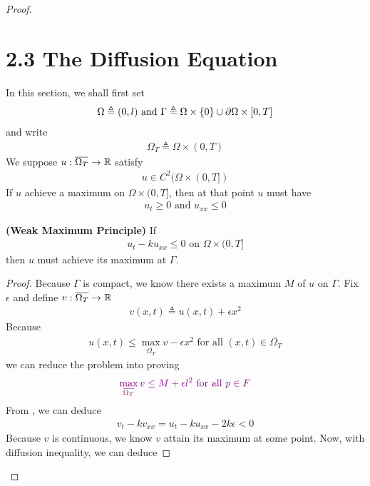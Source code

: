 \documentclass{report}
\begin{document}
\begin{proof}
\section{2.3 The Diffusion Equation}
\begin{mdframed}
In this section, we shall first set 
\begin{align*}
\Omega \triangleq (0,l)\text{ and }\Gamma \triangleq \Omega \times \{ 0 \}\cup  \partial \Omega \times [0,T]
\end{align*}
and write  
\begin{align*}
\Omega_T\triangleq \Omega \times (0,T)
\end{align*}
We suppose $u:\overline{\Omega_T}\rightarrow \mathbb{R}$ satisfy 
\begin{align*}
  u \in C^2(\Omega \times (0,T])
\end{align*}
If $u$ achieve a maximum on $\Omega \times (0,T]$, then at that point $u$ must have 
\begin{align*}
u_t\geq 0\text{ and }u_{xx}\leq 0
\end{align*}
\end{mdframed}
\begin{theorem}
\textbf{(Weak Maximum Principle)} If 
\begin{align}
\label{utk}
  u_t-ku_{xx}\leq  0\text{ on }\Omega \times (0,T]
\end{align}
then $u$ must achieve its maximum at  $\Gamma $.  
\end{theorem}
\begin{proof}
Because $\Gamma $ is compact, we know there exists a maximum $M$ of $u$ on $\Gamma $. Fix $\epsilon $ and define $v:\overline{\Omega_T}\rightarrow \mathbb{R}$
\begin{align*}
v(x,t)\triangleq u(x,t)+ \epsilon x^2
\end{align*}
Because 
\begin{align*}
u(x,t) \leq \max_{\overline{\Omega_T}}v - \epsilon x^2\text{ for all }(x,t)\in \overline{\Omega_T}
\end{align*}
we can reduce the problem into proving 
\begin{align*}
\textcolor{violet}{\max_{\overline{\Omega_T}}v\leq M+\epsilon l^2\text{ for all }p \in F}
\end{align*}
From , we can deduce
\begin{align*}
v_t-kv_{xx}=u_t-ku_{xx}-2k\epsilon  <0
\end{align*}
Because $v$ is continuous, we know $v$ attain its maximum at some point. Now, with diffusion inequality, we can deduce 

\end{proof}
\end{proof}
\end{document}
